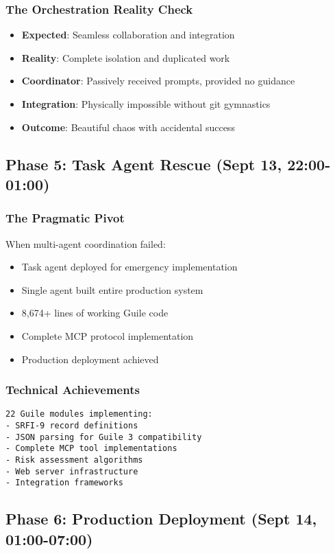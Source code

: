 \documentclass[11pt]{article}
\begin{document}
\subsubsection{The Orchestration Reality Check}
\label{sec:org190688d}
\begin{itemize}
\item \textbf{\textbf{Expected}}: Seamless collaboration and integration
\item \textbf{\textbf{Reality}}: Complete isolation and duplicated work
\item \textbf{\textbf{Coordinator}}: Passively received prompts, provided no guidance
\item \textbf{\textbf{Integration}}: Physically impossible without git gymnastics
\item \textbf{\textbf{Outcome}}: Beautiful chaos with accidental success
\end{itemize}
\subsection{Phase 5: Task Agent Rescue (Sept 13, 22:00-01:00)}
\label{sec:org0740f03}
\subsubsection{The Pragmatic Pivot}
\label{sec:org1b73110}
When multi-agent coordination failed:
\begin{itemize}
\item Task agent deployed for emergency implementation
\item Single agent built entire production system
\item 8,674+ lines of working Guile code
\item Complete MCP protocol implementation
\item Production deployment achieved
\end{itemize}
\subsubsection{Technical Achievements}
\label{sec:org7e1dd79}
\begin{verbatim}
22 Guile modules implementing:
- SRFI-9 record definitions
- JSON parsing for Guile 3 compatibility
- Complete MCP tool implementations
- Risk assessment algorithms
- Web server infrastructure
- Integration frameworks
\end{verbatim}
\subsection{Phase 6: Production Deployment (Sept 14, 01:00-07:00)}
\label{sec:orgca9c495}
\end{document}
